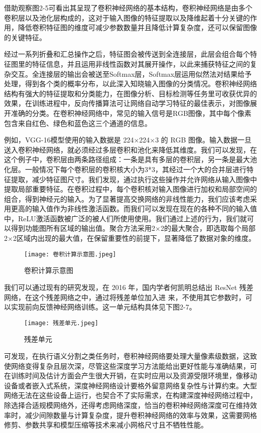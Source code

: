 借助观察图2-5可看出其呈现了卷积神经网络的基本结构，卷积神经网络是由多个卷积层以及池化层构成的，这对于输入图像的特征提取以及降维起着十分关键的作用，降低卷积特征图的维度可减少参数数量并且降低计算复杂度，还可以保留图像的关键特征。

经过一系列折叠和汇总操作之后，特征图会被传送到全连接层，此层会组合每个特征图里的特征信息，并且运用非线性函数对其展开操作，以此来捕获特征之间的复杂交互。全连接层的输出会被送至Softmax层，Softmax层运用似然法对结果给予处理，得到各个类的概率分布，以此深入知晓输入图像的分类情况。卷积神经网络结构有强大的特征提取和分类能力，在图像分析、目标检测等任务里可收获优异的效果，在训练进程中，反向传播算法可让网络自动学习特征的最佳表示，对图像展开准确的分类。在卷积神经网络中，常见的输入信号是RGB图像，其中每个像素包含来自红色、绿色和蓝色这三个通道的信息。

例如，VGG-16模型\cite{simonyan2014very}使用的输入数据是 224×224×3 的 RGB 图像。输入数据一旦送入卷积神经网络，就必须经过多层卷积和池化来降低其维度。我们可以发现，在这个例子中，卷积层由两条路径组成：一条是具有多层的卷积层，另一条是最大池化层。一般情况下每个卷积层的卷积核大小为3*3，其经过一个大的合并层进行特征提取，减少特征图尺寸。我们发现，通过执行这些操作并允许网络从输入图像中提取局部重要特征。在卷积过程中，每个卷积核对输入图像进行加权和局部空间的组合，得到神经元的输入。为了显著提高交换网络的非线性能力，我们应该考虑采用更高的输入值作为非线性激活函数。而我们可以发现在现在的各种不同的输入值中，ReLU激活函数被广泛的被人们所使用使用。我们通过上述的行为，我们就可以得到功能图所有区域的输出值。聚合方法采用2×2的最大聚合，即选取每个局部2×2区域内出现的最大值，在保留重要性的前提下，显著降低了数据对象的维度。

\begin{figure}[hbt]
	\centering
	\texttt{[image: 卷积计算示意图.jpeg]}
	\caption{卷积计算示意图}
	\label{f.example}
\end{figure}

我们可以通过现有的研究发现，在 2016 年，国内学者何凯明总结出 ResNet 残差网络\cite{he2016deep}，在这个残差网络之中，通过将残差单位加入进
来，不使用其它参数时，可以实现前向反馈神经网络训练。这一单元结构具体见下图2-7。

\begin{figure}[hbt]
	\centering
	\texttt{[image: 残差单元.jpeg]}
	\caption{残差单元}
	\label{f.example}
\end{figure}

可发现，在执行语义分割之类任务时，卷积神经网络要处理大量像素级数据，这致使网络变得复杂且层次深，尽管这些深度学习方法能给出更好性能与准确结果，可在训练时间及估计方面会产生很大开销，在实时应用以及资源受限环境里，像移动设备或者嵌入式系统，深度神经网络设计要格外留意网络复杂性与计算约束。大型网络无法在这些设备上运行，也契合不了实际需求，在构建深度神经网络过程中，除选择合适规模网络外，还得考虑网络深度，恰当的卷积神经网络深度可在维持效率时，减少间隙数量与计算复杂度，提升卷积神经网络的效率与效果，这需要网格修剪、参数共享和模型压缩等技术来减小网格尺寸且不牺牲性能。

